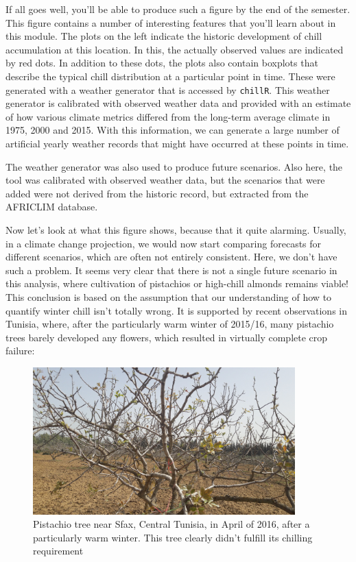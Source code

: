 \documentclass[
]{book}
\begin{document}
If all goes well, you'll be able to produce such a figure by the end of the semester. This figure contains a number of interesting features that you'll learn about in this module. The plots on the left indicate the historic development of chill accumulation at this location. In this, the actually observed values are indicated by red dots. In addition to these dots, the plots also contain boxplots that describe the typical chill distribution at a particular point in time. These were generated with a weather generator that is accessed by \texttt{chillR}. This weather generator is calibrated with observed weather data and provided with an estimate of how various climate metrics differed from the long-term average climate in 1975, 2000 and 2015. With this information, we can generate a large number of artificial yearly weather records that might have occurred at these points in time.

The weather generator was also used to produce future scenarios. Also here, the tool was calibrated with observed weather data, but the scenarios that were added were not derived from the historic record, but extracted from the AFRICLIM database.

Now let's look at what this figure shows, because that it quite alarming. Usually, in a climate change projection, we would now start comparing forecasts for different scenarios, which are often not entirely consistent. Here, we don't have such a problem. It seems very clear that there is not a single future scenario in this analysis, where cultivation of pistachios or high-chill almonds remains viable! This conclusion is based on the assumption that our understanding of how to quantify winter chill isn't totally wrong. It is supported by recent observations in Tunisia, where, after the particularly warm winter of 2015/16, many pistachio trees barely developed any flowers, which resulted in virtually complete crop failure:

\begin{figure}
\centering
\includegraphics[width=0.9\textwidth,height=\textheight]{pictures/Tunisia_pistachios.png}
\caption{Pistachio tree near Sfax, Central Tunisia, in April of 2016, after a particularly warm winter. This tree clearly didn't fulfill its chilling requirement}
\end{figure}
\end{document}
